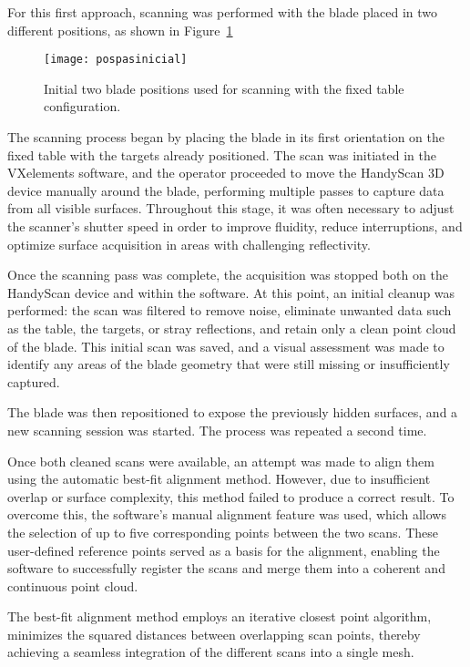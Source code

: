 For this first approach, scanning was performed with the blade placed in two different positions, as shown in Figure~\ref{fig:pospasinical}

\begin{figure}[H]
    \centering
    \texttt{[image: pospasinicial]}
    \caption{ Initial two blade positions used for scanning with the fixed table configuration.}
    \label{fig:pospasinical}
\end{figure}

The scanning process began by placing the blade in its first orientation on the fixed table with the targets already positioned. 
The scan was initiated in the VXelements software, and the operator proceeded to move the HandyScan 3D device manually around the blade, performing multiple passes to capture data from all visible surfaces. Throughout this stage, it was often necessary to adjust the scanner’s shutter speed in order to improve fluidity, reduce interruptions, and optimize surface acquisition in areas with challenging reflectivity.

Once the scanning pass was complete, the acquisition was stopped both on the HandyScan device and within the software. 
At this point, an initial cleanup was performed: the scan was filtered to remove noise, eliminate unwanted data such as the table, the targets, or stray reflections, and retain only a clean point cloud of the blade. This initial scan was saved, and a visual assessment was made to identify any areas of the blade geometry that were still missing or insufficiently captured.

The blade was then repositioned to expose the previously hidden surfaces, and a new scanning session was started. The process was repeated a second time.

Once both cleaned scans were available, an attempt was made to align them using the automatic best-fit alignment method. However, due to insufficient overlap or surface complexity, this method failed to produce a correct result. To overcome this, the software's manual alignment feature was used, which allows the selection of up to five corresponding points between the two scans. These user-defined reference points served as a basis for the alignment, enabling the software to successfully register the scans and merge them into a coherent and continuous point cloud.

The best-fit alignment method employs an iterative closest point algorithm, minimizes the squared distances between overlapping scan points, thereby achieving a seamless integration of the different scans into a single mesh.

